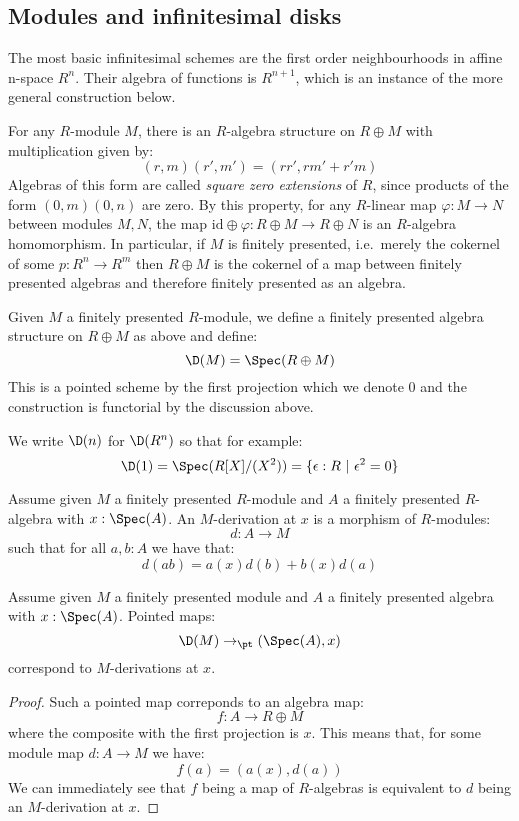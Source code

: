 
\subsection{Modules and infinitesimal disks}
The most basic infinitesimal schemes are the first order neighbourhoods in affine n-space $R^n$. Their algebra of functions is $R^{n+1}$, which is an instance of the more general construction below.

For any $R$-module $M$, there is an $R$-algebra structure on $R\oplus M$ with multiplication given by:
\[(r,m)(r',m') = (rr',rm'+r'm)\]
Algebras of this form are called \emph{square zero extensions} of $R$, since products of the form $(0,m)(0,n)$ are zero.
By this property, for any $R$-linear map $\varphi:M\to N$ between modules $M,N$, the map $\mathrm{id}\oplus \varphi: R\oplus M\to R\oplus N$ is an $R$-algebra homomorphism. In particular, if $M$ is finitely presented, i.e.\ merely the cokernel of some $p:R^n\to R^m$ then $R\oplus M$ is the cokernel of a map between finitely presented algebras and therefore finitely presented as an algebra. 

\begin{definition}
Given $M$ a finitely presented $R$-module, we define a finitely presented algebra structure on $R\oplus M$ as above and define:
\[\D(M) = \Spec(R\oplus M)\]
This is a pointed scheme by the first projection which we denote $0$
and the construction is functorial by the discussion above.
\end{definition}

We write $\D(n)$ for $\D(R^n)$ so that for example:
\[\D(1) = \Spec(R[X]/(X^2)) = \{\epsilon:R\ |\ \epsilon^2=0\}\]

\begin{definition}\label{derivation-pointwise}
Assume given $M$ a finitely presented $R$-module and $A$ a finitely presented $R$-algebra with $x:\Spec(A)$. An $M$-derivation at $x$ is a morphism of $R$-modules:
\[d:A\to M\]
such that for all $a,b:A$ we have that:
\[d(ab) = a(x)d(b) + b(x)d(a)\]
\end{definition}

\begin{lemma}\label{tangent-are-derivation}
Assume given $M$ a finitely presented module and $A$ a finitely presented algebra with $x:\Spec(A)$. Pointed maps:
\[\D(M)\to_\pt (\Spec(A),x)\] 
correspond to $M$-derivations at $x$.
\end{lemma}

\begin{proof}
Such a pointed map correponds to an algebra map:
\[f : A\to R\oplus M\]
where the composite with the first projection is $x$. This means that, for some module map $d:A\to M$ we have:
\[f(a) = (a(x),d(a))\]
We can immediately see that $f$ being a map of $R$-algebras is equivalent to $d$ being an $M$-derivation at $x$.
\end{proof}

